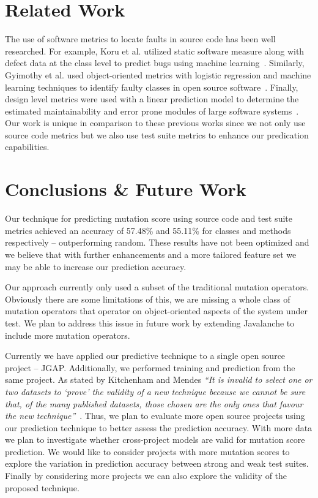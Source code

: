 \documentclass[conference]{IEEEtran}
\begin{document}
\section{Related Work}
\label{sec:related_work}
The use of software metrics to locate faults in source code has been well researched. For example, Koru et al. utilized static software measure along with defect data at the class level to predict bugs using machine learning~\cite{KL05}. Similarly, Gyimothy et al. used object-oriented metrics with logistic regression and machine learning techniques to identify faulty classes in open source software~\cite{GFS05}. Finally, design level metrics were used with a linear prediction model to determine the estimated maintainability and error prone modules of large software systems~\cite{MKPS00}. Our work is unique in comparison to these previous works since we not only use source code metrics but we also use test suite metrics to enhance our predication capabilities.


\section{Conclusions \& Future Work}
\label{sec:conclusions_future_work}
Our technique for predicting mutation score using source code and test suite metrics achieved an accuracy of 57.48\% and 55.11\% for classes and methods respectively -- outperforming random. These results have not been optimized and we believe that with further enhancements and a more tailored feature set we may be able to increase our prediction accuracy.

Our approach currently only used a subset of the traditional mutation operators. Obviously there are some limitations of this, we are missing a whole class of mutation operators that operator on object-oriented aspects of the system under test. We plan to address this issue in future work by extending Javalanche to include more mutation operators.

Currently we have applied our predictive technique to a single open source project -- JGAP. Additionally, we performed training and prediction from the same project. As stated by Kitchenham and Mendes \textit{``It is invalid to select one or two datasets to `prove' the validity of a new technique because we cannot be sure that, of the many published datasets, those chosen are the only ones that favour the new technique''}~\cite{KM09}. Thus, we plan to evaluate more open source projects using our prediction technique to better assess the prediction accuracy. With more data we plan to investigate whether cross-project models are valid for mutation score prediction. We would like to consider projects with more mutation scores to explore the variation in prediction accuracy between strong and weak test suites. Finally by considering more projects we can also explore the validity of the proposed technique.




\end{document}
